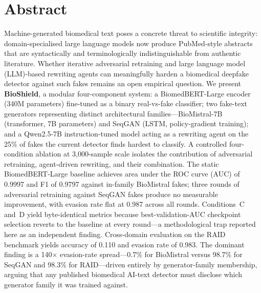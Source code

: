 \documentclass[12pt,a4paper]{article}
\begin{document}
\newpage
\thispagestyle{empty}
\tableofcontents
\newpage

\section*{Abstract}

Machine-generated biomedical text poses a concrete threat to scientific
integrity: domain-specialised large language models now produce PubMed-style
abstracts that are syntactically and terminologically indistinguishable from
authentic literature. Whether iterative adversarial retraining and large
language model (LLM)-based rewriting agents can meaningfully harden a
biomedical deepfake detector against such fakes remains an open empirical
question. We present \textbf{BioShield}, a modular four-component system: a
BiomedBERT-Large encoder (340M parameters) fine-tuned as a binary
real-vs-fake classifier; two fake-text generators representing distinct
architectural families---BioMistral-7B (transformer, 7B parameters) and
SeqGAN (LSTM, policy-gradient training); and a Qwen2.5-7B instruction-tuned
model acting as a rewriting agent on the 25\% of fakes the current detector
finds hardest to classify.
A controlled four-condition ablation at 3,000-sample scale isolates the
contribution of adversarial retraining, agent-driven rewriting, and their
combination. The static BiomedBERT-Large baseline achieves area under the
ROC curve (AUC) of 0.9997 and F1 of 0.9797 against in-family BioMistral
fakes; three rounds of adversarial retraining against SeqGAN fakes produce
no measurable improvement, with evasion rate flat at 0.987 across all
rounds. Conditions~C and~D yield byte-identical metrics because
best-validation-AUC checkpoint selection reverts to the baseline at every
round---a methodological trap reported here as an independent finding.
Cross-domain evaluation on the RAID benchmark yields accuracy of 0.110 and
evasion rate of 0.983. The dominant finding is a 140$\times$ evasion-rate
spread---0.7\% for BioMistral versus 98.7\% for SeqGAN and 98.3\% for
RAID---driven entirely by generator-family membership, arguing that any
published biomedical AI-text detector must disclose which generator family
it was trained against.
\end{document}
